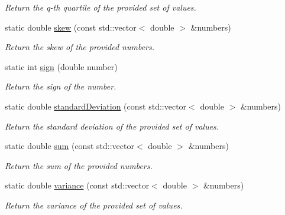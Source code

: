 \begin{DoxyCompactItemize}
\begin{DoxyCompactList}\small\item\em \-Return the q-\/th quartile of the provided set of values. \end{DoxyCompactList}\item 
static double \hyperlink{classmultiscale_1_1Numeric_a3e6b145db3ae9d7d21c3992353211125}{skew} (const std\-::vector$<$ double $>$ \&numbers)
\begin{DoxyCompactList}\small\item\em \-Return the skew of the provided numbers. \end{DoxyCompactList}\item 
static int \hyperlink{classmultiscale_1_1Numeric_a2b3058c5ad27aaaef338a29b96cdbced}{sign} (double number)
\begin{DoxyCompactList}\small\item\em \-Return the sign of the number. \end{DoxyCompactList}\item 
static double \hyperlink{classmultiscale_1_1Numeric_aa842f3143ada026759ec0474816c97ae}{standard\-Deviation} (const std\-::vector$<$ double $>$ \&numbers)
\begin{DoxyCompactList}\small\item\em \-Return the standard deviation of the provided set of values. \end{DoxyCompactList}\item 
static double \hyperlink{classmultiscale_1_1Numeric_aca9366c38b9b992793dd364b8e421bbd}{sum} (const std\-::vector$<$ double $>$ \&numbers)
\begin{DoxyCompactList}\small\item\em \-Return the sum of the provided numbers. \end{DoxyCompactList}\item 
static double \hyperlink{classmultiscale_1_1Numeric_a91bf7963069d7a51f01dff965508039c}{variance} (const std\-::vector$<$ double $>$ \&numbers)
\begin{DoxyCompactList}\small\item\em \-Return the variance of the provided set of values. \end{DoxyCompactList}\end{DoxyCompactItemize}
